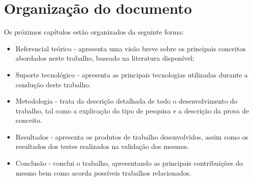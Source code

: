 \section{Organização do documento}

Os próximos capítulos estão organizados da seguinte forma:

\begin{itemize}
	\item Referencial teórico - apresenta uma visão breve sobre os principais conceitos abordados neste trabalho, baseado na literatura disponível;
	\item Suporte tecnológico - apresenta as principais tecnologias utilizadas durante a condução deste trabalho.
	\item Metodologia - trata da descrição detalhada de todo o desenvolvimento do trabalho, tal como a explicação do tipo de pesquisa e a descrição da prova de conceito. 
	\item Resultados - apresenta os produtos de trabalho desenvolvidos, assim como os resultados dos testes realizados na validação dos mesmos.
	\item Conclusão - conclui o trabalho, apresentando as principais contribuições do mesmo bem como acorda possíveis trabalhos relacionados.
\end{itemize}